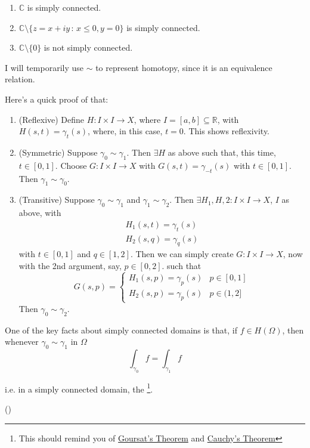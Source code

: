 \documentclass[11pt, oneside]{book}
\begin{document}
\begin{ex}
  \begin{enumerate}
    \item $\mathbb{C}$ is simply connected.
    \item $\mathbb{C} \setminus \{z = x + iy \, : \, x \leq 0, y = 0\}$ is simply connected.
    \item $\mathbb{C} \setminus \{0\}$ is not simply connected.
  \end{enumerate}
\end{ex}

\begin{note}
  I will temporarily use $\sim$ to represent homotopy, since it is an equivalence relation.

  Here's a quick proof of that:
  \begin{enumerate}
    \item (Reflexive) Define $H : I \times I \to X$, where $I = [a, b] \subseteq \mathbb{R}$, with $H(s, t) = \gamma_t(s)$, where, in this case, $t = 0$. This shows reflexivity.

    \item (Symmetric) Suppose $\gamma_0 \sim \gamma_1$. Then $\exists H$ as above such that, this time, $t \in [0, 1]$. Choose $G : I \times I \to X$ with $G(s, t) = \gamma_{-t}(s)$ with $t \in [0, 1]$. Then $\gamma_1 \sim \gamma_0$.

    \item (Transitive) Suppose $\gamma_0 \sim \gamma_1$ and $\gamma_1 \sim \gamma_2$. Then $\exists H_1, H,2 : I \times I \to X$, $I$ as above, with
    \begin{gather*}
      H_1(s, t) = \gamma_t(s) \\
      H_2(s, q) = \gamma_q(s)
    \end{gather*}
    with $t \in [0, 1]$ and $q \in [1, 2]$. Then we can simply create $G : I \times I \to X$, now with the 2nd argument, say, $p \in [0, 2]$. such that
    \begin{equation*}
      G(s, p) = \begin{cases}
        H_1(s, p) = \gamma_p (s) & p \in [0, 1] \\
        H_2(s, p) = \gamma_p (s) & p \in (1, 2]
      \end{cases}
    \end{equation*}
    Then $\gamma_0 \sim \gamma_2$.
  \end{enumerate}

  One of the key facts about simply connected domains is that, if $f \in H(\Omega)$, then whenever $\gamma_0 \sim \gamma_1$ in $\Omega$
  \begin{equation*}
    \int_{\gamma_0} f = \int_{\gamma_1} f
  \end{equation*}

  i.e. in a simply connected domain, the \footnote{This should remind you of \hyperref[thm:goursat_s_theorem]{Goursat's Theorem} and \hyperref[thm:cauchy_s_theorem_for_convex_set]{Cauchy's Theorem}}.
\end{note}

()



\printindex
\end{document}
